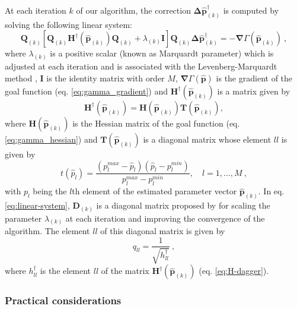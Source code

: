 At each iteration $k$ of our algorithm, the correction $\boldsymbol{\Delta}\hat{\mathbf{p}}^{\dagger}_{(k)}$ is computed by solving the following linear system:
\begin{equation}\label{eq:linear-system}
\mathbf{Q}_{(k)} \left[\mathbf{Q}_{(k)} \mathbf{H}^{\dagger}(\hat{\mathbf{p}}_{(k)}) \mathbf{Q}_{(k)} + \lambda_{(k)} \mathbf{I}\right] \mathbf{Q}_{(k)} \boldsymbol{\Delta} \hat{\mathbf{p}}^{\dagger}_{(k)} = -\boldsymbol{\nabla}\Gamma(\hat{\mathbf{p}}_{(k)}) \: ,
\end{equation}
where $\lambda_{(k)}$ is a positive scalar (known as Marquardt parameter) which is adjusted at each iteration and 
is associated with the Levenberg-Marquardt method \cite[e.g., ][ p. 240]{silva-2001,aster-etal2019},
$\mathbf{I}$ is the identity matrix with order $M$, $\boldsymbol{\nabla}\Gamma(\hat{\mathbf{p}})$
is the gradient of the 
goal function (eq. \ref{eq:gamma_gradient}) and $\mathbf{H}^{\dagger}(\hat{\mathbf{p}}_{(k)})$ is a matrix given by
\begin{equation}\label{eq:H-dagger}
\mathbf{H}^{\dagger}(\hat{\mathbf{p}}_{(k)}) = \mathbf{H}(\hat{\mathbf{p}}_{(k)})\mathbf{T}(\hat{\mathbf{p}}_{(k)}),
\end{equation}
where $\mathbf{H}(\hat{\mathbf{p}}_{(k)})$ is the Hessian matrix of the goal function (eq. \ref{eq:gamma_hessian}) and $\mathbf{T}(\hat{\mathbf{p}}_{(k)})$ is a diagonal matrix whose element $ll$ is given by
\begin{equation}\label{eq:inequality-diag}
t(\hat{p}_{l}) = \frac{(p_{l}^{max} - \hat{p}_{l})(\hat{p}_{l} - p_{l}^{min})}{p_{l}^{max} - p_{l}^{min}}, \quad l = 1, \dots, M \: ,
\end{equation}
with $p_{l}$ being the $l$th element of the estimated parameter vector $\hat{\mathbf{p}}_{(k)}$. In eq. \ref{eq:linear-system}, $\mathbf{D}_{(k)}$ is a diagonal matrix proposed by  \cite{marquardt_algorithm_1963} for scaling the parameter $\lambda_{(k)}$ at each iteration and improving the convergence of the algorithm. The element $ll$ of this diagonal matrix is given by
\begin{equation}\label{eq:Q-matrix}
q_{ll} = \frac{1}{\sqrt{h^{\dagger}_{ll}}} \: ,
\end{equation}
where $h^{\dagger}_{ll}$ is the element $ll$ of the matrix $\mathbf{H}^{\dagger}(\hat{\mathbf{p}}_{(k)})$ (eq. \ref{eq:H-dagger}). 


\subsubsection{Practical considerations}


